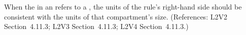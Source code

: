 When the  in an \AssignmentRule refers to a \Compartment,
the units of the rule's right-hand side should be consistent with the units
of that compartment's size.  (References: L2V2 Section~4.11.3;
L2V3 Section~4.11.3; L2V4 Section~4.11.3.)

